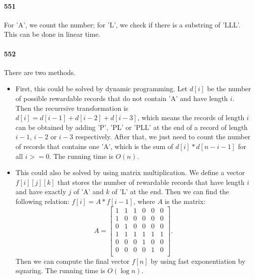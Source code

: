 \documentclass[11pt]{article}
\begin{document}
\paragraph{551}
For 'A', we count the number; for 'L', we check if there is a substring of 'LLL'. This can be done in linear time.

\paragraph{552}
There are two methods.
\begin{itemize}
\item First, this could be solved by dynamic programming. Let $d[i]$ be the number of possible rewardable records that do not contain 'A' and
have length $i$. Then the recurrsive transformation is $d[i] = d[i-1] + d[i-2] + d[i-3]$, which means the records of length $i$
can be obtained by adding 'P', 'PL' or 'PLL' at the end of a record of length $i-1$, $i-2$ or $i-3$ respectively.
After that, we just need to count the number of records that contains one 'A', which is the sum of $d[i] * d[n-i-1]$ for all
$i>=0$. The running time is $O(n)$. 

\item This could also be solved by using matrix multiplication. We define a vector $f[i][j][k]$ that stores the number of 
rewardable records that have length $i$ and have exactly $j$ of 'A' and $k$ of 'L' at the end. Then we can find the following
relation: $f[i] = A * f[i-1]$, where $A$ is the matrix:
\[A=\left[ 
\begin{array}{cccccc}
1 & 1 & 1 & 0 & 0 & 0 \\ 
1 & 0 & 0 & 0 & 0 & 0 \\ 
0 & 1 & 0 & 0 & 0 & 0 \\
1 & 1 & 1 & 1 & 1 & 1 \\
0 & 0 & 0 & 1 & 0 & 0 \\
0 & 0 & 0 & 0 & 1 & 0 \\
\end{array} \right]. \]
Then we can compute the final vector $f[n]$ by using fast exponentiation by squaring. The running time is $O(\log n)$.
\end{itemize}
\end{document}
